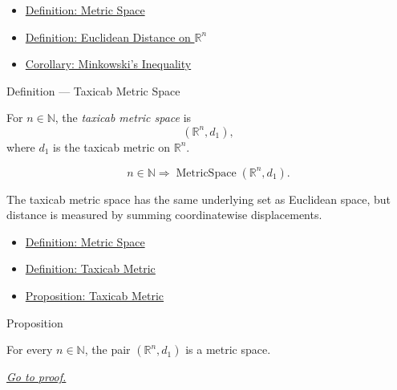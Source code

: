 \begin{dependencies}
\begin{itemize}
  \item \hyperref[def:metric-space]{Definition: Metric Space}
  \item \hyperref[def:euclidean-distance-rn]{Definition: Euclidean Distance on \(\mathbb{R}^n\)}
  \item \hyperref[cor:minkowski-inequality-rn]{Corollary: Minkowski's Inequality}
\end{itemize}
\end{dependencies}

\begin{definitionbox}{Definition --- Taxicab Metric Space}
\begin{definition}\label{def:taxicab-metric-space}
For \(n\in\mathbb{N}\), the \emph{taxicab metric space} is
\[
  (\mathbb{R}^n,d_1),
\]
where \(d_1\) is the taxicab metric on \(\mathbb{R}^n\).
\end{definition}
\end{definitionbox}

\begin{remark*}
\[
n\in\mathbb{N}
\Longrightarrow
\operatorname{MetricSpace}(\mathbb{R}^n,d_1).
\]
\end{remark*}

\begin{remark*}[Interpretation]
The taxicab metric space has the same underlying set as Euclidean space, but
distance is measured by summing coordinatewise displacements.
\end{remark*}

\begin{dependencies}
\begin{itemize}
  \item \hyperref[def:metric-space]{Definition: Metric Space}
  \item \hyperref[def:taxicab-metric-rn]{Definition: Taxicab Metric}
  \item \hyperref[prop:taxicab-metric-rn]{Proposition: Taxicab Metric}
\end{itemize}
\end{dependencies}

\begin{propositionbox}{Proposition}
\begin{proposition}
\label{prop:taxicab-metric-space-instance}
For every \(n\in\mathbb{N}\), the pair \((\mathbb{R}^n,d_1)\) is a metric space.

\smallskip
\noindent
\hyperref[prf:taxicab-metric-space-instance]{\textit{Go to proof.}}
\end{proposition}
\end{propositionbox}

